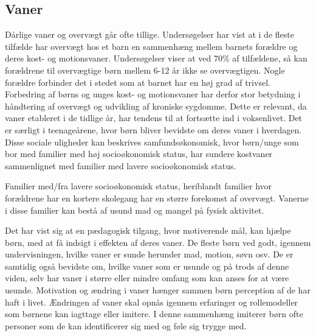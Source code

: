 \subsection{Vaner}

Dårlige vaner og overvægt går ofte tillige. Undersøgelser har vist at i de fleste tilfælde har overvægt hos et barn en sammenhæng mellem barnets forældre og deres kost- og motionsvaner. Undersøgelser viser at ved 70\% af tilfældene, så kan forældrene til overvægtige børn mellem 6-12 år ikke se overvægtigen. Nogle forældre forbinder det i stedet som at barnet har en høj grad af trivsel.\citep{videnskab} 
Forbedring af børns og unges kost- og motionsvaner har derfor stor betydning i håndtering af overvægt og udvikling af kroniske sygdomme. Dette er relevant, da vaner etableret i de tidlige år, har tendens til at fortsætte ind i voksenlivet.\citep{trends}  Det er særligt i teenageårene, hvor børn bliver bevidste om deres vaner i hverdagen.\citep{dansker} 
Disse sociale uligheder kan beskrives samfundsøkonomisk, hvor børn/unge som bor med familier med høj socioøkonomisk status, har sundere kostvaner sammenlignet med familier med lavere socioøkonomisk status.\citep{trends} 

Familier med/fra lavere socioøkonomisk status, heriblandt familier hvor forældrene har en kortere skolegang har en større forekomst af overvægt. 
Vanerne i disse familier kan bestå af usund mad og mangel på fysisk aktivitet.

Det har vist sig at en pædagogisk tilgang, hvor motiverende mål, kan hjælpe børn, med at få indsigt i effekten af deres vaner. De fleste børn ved godt, igennem undervisningen, hvilke vaner er sunde herunder mad, motion, søvn osv. De er samtidig også bevidste om, hvilke vaner som er usunde og på trods af denne viden, selv har vaner i større eller mindre omfang som kan anses for at være usunde. 
Motivation og ændring i vaner hænger sammen børn perception af de har haft i livet. Ændringen af vaner skal opnås igennem erfaringer og rollemodeller som børnene kan iagttage eller imitere. I denne sammenhæng imiterer børn ofte personer som de kan identificerer sig med og føle sig trygge med.\citep{opsporing}
